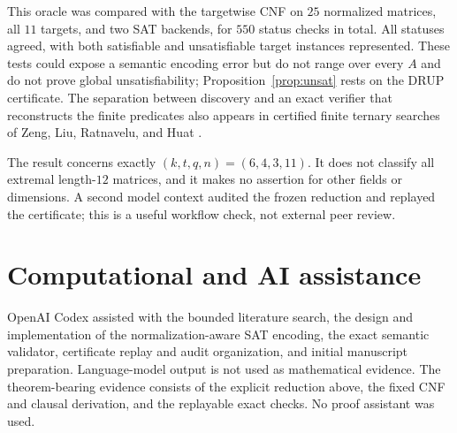 \documentclass[11pt]{article}
\begin{document}
This oracle was compared with the targetwise CNF on $25$ normalized
matrices, all $11$ targets, and two SAT backends, for $550$ status checks
in total.  All statuses agreed, with both satisfiable and unsatisfiable
target instances represented.  These tests could expose a semantic
encoding error but do not range over every $A$ and do not prove global
unsatisfiability; Proposition~\ref{prop:unsat} rests on the DRUP
certificate.  The separation between discovery and an exact verifier
that reconstructs the finite predicates also appears in certified
finite ternary searches of Zeng, Liu, Ratnavelu, and Huat
\cite{ZengEtAl2026TernaryCertificates}.

The result concerns exactly $(k,t,q,n)=(6,4,3,11)$.  It does not classify
all extremal length-$12$ matrices, and it makes no assertion for other
fields or dimensions.  A second model context audited the frozen
reduction and replayed the certificate; this is a useful workflow check,
not external peer review.

\section*{Computational and AI assistance}

OpenAI Codex assisted with the bounded literature search, the design and
implementation of the normalization-aware SAT encoding, the exact
semantic validator, certificate replay and audit organization, and
initial manuscript preparation.  Language-model output is not used as
mathematical evidence.  The theorem-bearing evidence consists of the
explicit reduction above, the fixed CNF and clausal derivation, and the
replayable exact checks.  No proof assistant was used.



\end{document}
